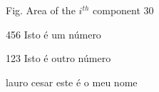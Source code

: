

\begin{siglas}
\item[Fig.] Area of the $i^{th}$ component
30
\item[456] Isto é um número
\item[123] Isto é outro número
\item[lauro cesar] este é o meu nome
\end{siglas}
